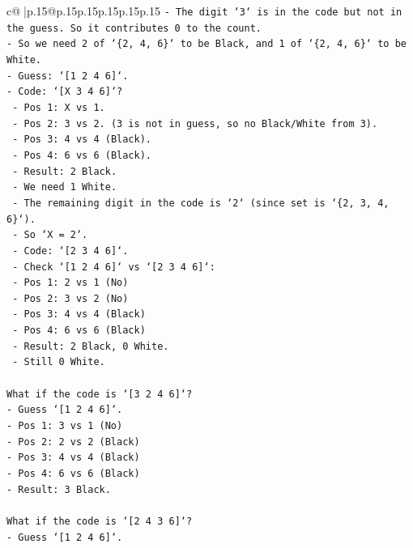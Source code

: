 \documentclass{article}
\begin{document}
{\begin{supertabular}{c@{$\;$}|p{.15\linewidth}@{}p{.15\linewidth}p{.15\linewidth}p{.15\linewidth}p{.15\linewidth}p{.15\linewidth}}
{{{\texttt{{-} The digit `3` is in the code but not in the guess. So it contributes 0 to the count.} \\
\texttt{{-} So we need 2 of `\{2, 4, 6\}` to be Black, and 1 of `\{2, 4, 6\}` to be White.} \\
\texttt{{-} Guess: `{[}1 2 4 6{]}`.} \\
\texttt{{-} Code: `{[}X 3 4 6{]}`?} \\
\texttt{  {-} Pos 1: X vs 1.} \\
\texttt{  {-} Pos 2: 3 vs 2. (3 is not in guess, so no Black/White from 3).} \\
\texttt{  {-} Pos 3: 4 vs 4 (Black).} \\
\texttt{  {-} Pos 4: 6 vs 6 (Black).} \\
\texttt{  {-} Result: 2 Black.} \\
\texttt{  {-} We need 1 White.} \\
\texttt{  {-} The remaining digit in the code is `2` (since set is `\{2, 3, 4, 6\}`).} \\
\texttt{  {-} So `X = 2`.} \\
\texttt{  {-} Code: `{[}2 3 4 6{]}`.} \\
\texttt{  {-} Check `{[}1 2 4 6{]}` vs `{[}2 3 4 6{]}`:} \\
\texttt{    {-} Pos 1: 2 vs 1 (No)} \\
\texttt{    {-} Pos 2: 3 vs 2 (No)} \\
\texttt{    {-} Pos 3: 4 vs 4 (Black)} \\
\texttt{    {-} Pos 4: 6 vs 6 (Black)} \\
\texttt{    {-} Result: 2 Black, 0 White.} \\
\texttt{  {-} Still 0 White.} \\
\\ 
\texttt{What if the code is `{[}3 2 4 6{]}`?} \\
\texttt{{-} Guess `{[}1 2 4 6{]}`.} \\
\texttt{{-} Pos 1: 3 vs 1 (No)} \\
\texttt{{-} Pos 2: 2 vs 2 (Black)} \\
\texttt{{-} Pos 3: 4 vs 4 (Black)} \\
\texttt{{-} Pos 4: 6 vs 6 (Black)} \\
\texttt{{-} Result: 3 Black.} \\
\\ 
\texttt{What if the code is `{[}2 4 3 6{]}`?} \\
\texttt{{-} Guess `{[}1 2 4 6{]}`.} \\
}}}
\end{supertabular}}
\end{document}
